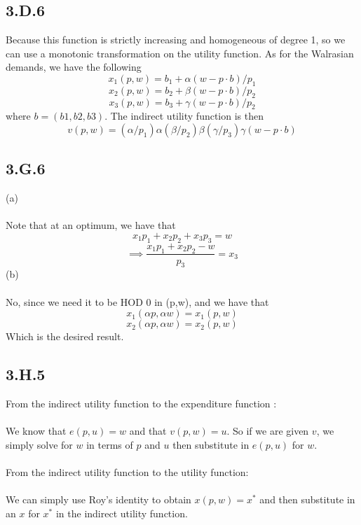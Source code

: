 \documentclass[letterpaper,12pt]{article}
\theoremstyle{definition}
\begin{document}
\subsection*{3.D.6}
Because this function is strictly increasing and homogeneous of degree 1, so we can use a monotonic transformation on the utility function.
As for the Walrasian demands, we have the following
\[x_1(p,w) = b_1 +\alpha(w - p\cdot b)/p_1\] 
\[x_2(p,w) = b_2 +\beta(w - p\cdot b)/p_2\]
\[x_3(p,w) = b_3+\gamma(w - p\cdot b)/p_2\] 
where $b=(b1,b2,b3)$.
The indirect utility function is then 
\[v(p,w) = (\alpha/p_1)\alpha(\beta/p_2)\beta(\gamma/p_3)\gamma(w − p \cdot b)\]

\subsection*{3.G.6}
(a)\\\\
Note that at an optimum, we have that
\[ x_1p_1 + x_2p_2 + x_3p_3 = w\]
\[\implies \frac{x_1p_1 + x_2p_2  - w}{p_3}  = x_3\]
(b)\\\\
No, since we need it to be HOD $0$ in (p,w), and we have that
\[x_1(\alpha p, \alpha w) = x_1 (p,w) \]
\[x_2(\alpha p, \alpha w) = x_2 (p,w) \]
Which is the desired result.

\subsection*{3.H.5}
From the indirect utility function to the expenditure function :\\\\
We know that $e(p,u) = w$ and  that $v(p,w) = u$. So if we are given $v$, we simply solve for $w$ in terms of $p$ and $u$ then substitute in $e(p,u)$ for $w$.\\\\
From the indirect utility function to the utility function:\\\\
We can simply use Roy's identity to obtain $x(p,w) = x^*$ and then substitute in an $x$ for $x^*$ in the indirect utility function. 
\end{document}
